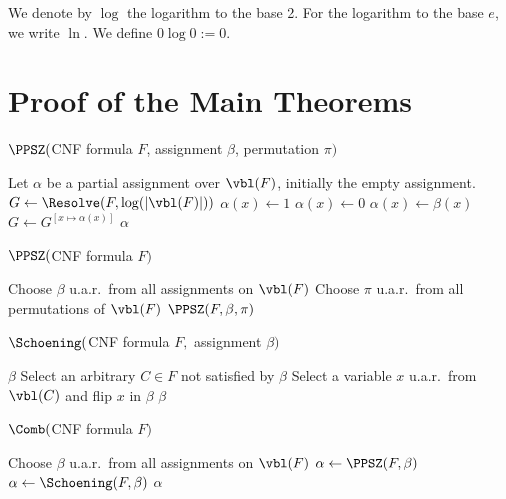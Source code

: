We denote by $\log$ the logarithm to the base 2. For the logarithm to
the base $e$, we write $\ln$. We define $0\log 0:= 0$.

\section{Proof of the Main Theorems}

\begin{algorithm}[t]
\caption{$\PPSZ($CNF formula $F$, assignment $\beta$, permutation $\pi)$}
\begin{algorithmic}
\STATE Let $\alpha$ be a 
partial assignment over $\vbl(F)$, initially the empty assignment.
\STATE $G\leftarrow \Resolve(F,\log(|\vbl(F)|))$
\STATE $\alpha(x)\leftarrow 1$
\STATE $\alpha(x)\leftarrow 0$
\ELSE 
\STATE $\alpha(x)\leftarrow\beta(x)$
\ENDIF
\STATE $G\leftarrow G^{[x\mapsto \alpha(x)]}$
\ENDFOR
\RETURN $\alpha$
\end{algorithmic}
\end{algorithm}
\begin{algorithm}[t]
\caption{$\PPSZ($CNF formula $F)$}
\begin{algorithmic}
  \STATE {} \STATE Choose
  $\beta$ u.a.r.\ from all assignments on $\vbl(F)$ \STATE Choose
  $\pi$ u.a.r.\ from all permutations of $\vbl(F)$ \RETURN
  $\PPSZ(F,\beta, \pi)$
\end{algorithmic}
\end{algorithm}
\begin{algorithm}[t]
\caption{$\Schoening($CNF formula $F,$ assignment $\beta)$}
\begin{algorithmic}
\RETURN $\beta$
\ENDIF
\STATE Select an arbitrary $C\in F$ not satisfied by $\beta$
\STATE Select a variable $x$ u.a.r.\ from $\vbl(C)$ and flip $x$ in $\beta$
\ENDFOR
\RETURN $\beta$
\end{algorithmic}
\end{algorithm}
\begin{algorithm}[t]
\caption{$\Comb($CNF formula $F)$}
\begin{algorithmic}
\STATE
{}
\STATE Choose $\beta$ u.a.r.\ from all assignments on $\vbl(F)$
\STATE $\alpha\leftarrow \PPSZ(F,\beta)$
\STATE $\alpha\leftarrow \Schoening(F,\beta)$
\ENDIF
\RETURN $\alpha$
\end{algorithmic}
\end{algorithm}



